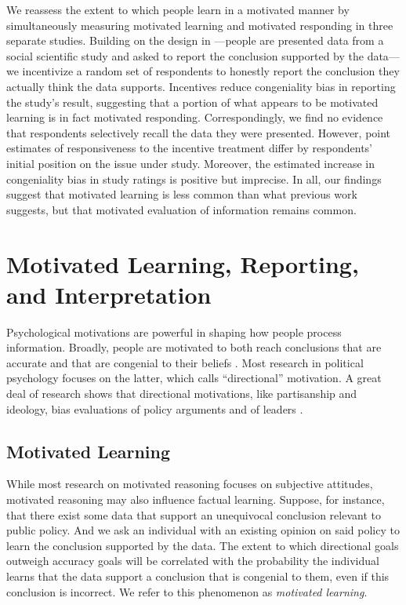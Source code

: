 \documentclass[12pt,letterpaper]{article}
\begin{document}
We reassess the extent to which people learn in a motivated manner by simultaneously measuring motivated learning and motivated responding in three separate studies. Building on the design in \citet{kahan2017}---people are presented data from a social scientific study and asked to report the conclusion supported by the data---we incentivize a random set of respondents to honestly report the conclusion they actually think the data supports. Incentives reduce congeniality bias in reporting the study's result, suggesting that a portion of what appears to be motivated learning is in fact motivated responding. Correspondingly, we find no evidence that respondents selectively recall the data they were presented. However, point estimates of responsiveness to the incentive treatment differ by respondents' initial position on the issue under study. Moreover, the estimated increase in congeniality bias in study ratings is positive but imprecise. In all, our findings suggest that motivated learning is less common than what previous work suggests, but that motivated evaluation of information remains common.

\section*{Motivated Learning, Reporting, and Interpretation}

Psychological motivations are powerful in shaping how people process information. Broadly, people are motivated to both reach conclusions that are accurate and that are congenial to their beliefs \citep[see][]{kunda1990}. Most research in political psychology focuses on the latter, which \citeauthor{kunda1990} calls ``directional'' motivation. A great deal of research shows that directional motivations, like partisanship and ideology, bias evaluations of policy arguments \citep[e.g.,][]{lord1979, taber2006, bolsen2014} and of leaders \citep[e.g.,][]{bartels2002, lebo2007, kim2010}.

\subsection*{Motivated Learning}
While most research on motivated reasoning focuses on subjective attitudes, motivated reasoning may also influence factual learning. Suppose, for instance, that there exist some data that support an unequivocal conclusion relevant to public policy. And we ask an individual with an existing opinion on said policy to learn the conclusion supported by the data. The extent to which directional goals outweigh accuracy goals will be correlated with the probability the individual learns that the data support a conclusion that is congenial to them, even if this conclusion is incorrect. We refer to this phenomenon as {\it motivated learning}.
\end{document}
